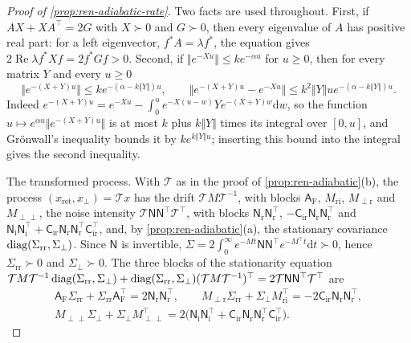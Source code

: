 \begin{proof}[Proof of \cref{prop:ren-adiabatic-rate}]
Two facts are used throughout. First, if $AX+XA^\top=2G$ with $X\succ0$ and $G\succ0$, then every eigenvalue of $A$ has positive real part: for a left eigenvector, $f^\ast A=\lambda f^\ast$, the equation gives $2\operatorname{Re}\lambda f^\ast Xf=2f^\ast Gf>0$. Second, if $\Vert e^{-Xu}\Vert\le ke^{-\alpha u}$ for $u\ge0$, then for every matrix $Y$ and every $u\ge0$
\begin{equation}\label{eq:ren-adiabatic-perturbation}
\bigl\Vert e^{-(X+Y)u}\bigr\Vert\le ke^{-(\alpha-k\Vert Y\Vert)u},\qquad\bigl\Vert e^{-(X+Y)u}-e^{-Xu}\bigr\Vert\le k^2\Vert Y\Vert ue^{-(\alpha-k\Vert Y\Vert)u}.
\end{equation}
Indeed $e^{-(X+Y)u}=e^{-Xu}-\int_0^ue^{-X(u-w)}Ye^{-(X+Y)w}\mathrm dw$, so the function $u\mapsto e^{\alpha u}\Vert e^{-(X+Y)u}\Vert$ is at most $k$ plus $k\Vert Y\Vert$ times its integral over $[0,u]$, and Gr\"onwall's inequality bounds it by $ke^{k\Vert Y\Vert u}$; inserting this bound into the integral gives the second inequality.

The transformed process. With $\mathcal T$ as in the proof of \cref{prop:ren-adiabatic}(b), the process $(x_{\mathrm{ret}},x_\perp)=\mathcal Tx$ has the drift $\mathcal TM\mathcal T^{-1}$, with blocks $\mathsf A_{\mathrm F}$, $M_{\mathrm{ri}}$, $M_{\perp\mathrm r}$ and $M_{\perp\perp}$, the noise intensity $\mathcal T\mathsf N\mathsf N^\top\mathcal T^\top$, with blocks $\mathsf N_{\mathrm r}\mathsf N_{\mathrm r}^\top$, $-\mathsf C_{\mathrm{ir}}\mathsf N_{\mathrm r}\mathsf N_{\mathrm r}^\top$ and $\mathsf N_{\mathrm i}\mathsf N_{\mathrm i}^\top+\mathsf C_{\mathrm{ir}}\mathsf N_{\mathrm r}\mathsf N_{\mathrm r}^\top\mathsf C_{\mathrm{ir}}^\top$, and, by \cref{prop:ren-adiabatic}(a), the stationary covariance $\operatorname{diag}(\Sigma_{\mathrm{rr}},\Sigma_\perp)$. Since $\mathsf N$ is invertible, $\Sigma=2\int_0^\infty e^{-Mt}\mathsf N\mathsf N^\top e^{-M^\top t}\mathrm dt\succ0$, hence $\Sigma_{\mathrm{rr}}\succ0$ and $\Sigma_\perp\succ0$. The three blocks of the stationarity equation $\mathcal TM\mathcal T^{-1}\operatorname{diag}(\Sigma_{\mathrm{rr}},\Sigma_\perp)+\operatorname{diag}(\Sigma_{\mathrm{rr}},\Sigma_\perp)(\mathcal TM\mathcal T^{-1})^\top=2\mathcal T\mathsf N\mathsf N^\top\mathcal T^\top$ are
\begin{equation}\label{eq:ren-adiabatic-blocks}
\begin{gathered}
\mathsf A_{\mathrm F}\Sigma_{\mathrm{rr}}+\Sigma_{\mathrm{rr}}\mathsf A_{\mathrm F}^\top=2\mathsf N_{\mathrm r}\mathsf N_{\mathrm r}^\top,\qquad M_{\perp\mathrm r}\Sigma_{\mathrm{rr}}+\Sigma_\perp M_{\mathrm{ri}}^\top=-2\mathsf C_{\mathrm{ir}}\mathsf N_{\mathrm r}\mathsf N_{\mathrm r}^\top,\\
M_{\perp\perp}\Sigma_\perp+\Sigma_\perp M_{\perp\perp}^\top=2\bigl(\mathsf N_{\mathrm i}\mathsf N_{\mathrm i}^\top+\mathsf C_{\mathrm{ir}}\mathsf N_{\mathrm r}\mathsf N_{\mathrm r}^\top\mathsf C_{\mathrm{ir}}^\top\bigr).
\end{gathered}
\end{equation}


\end{proof}
